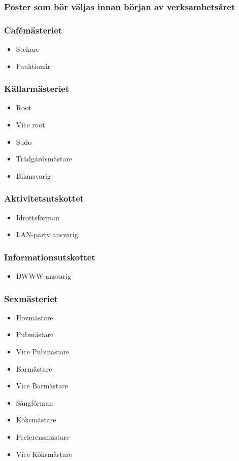 \documentclass{dsekprotokoll}
\begin{document}
\subsubsection*{Poster som bör väljas innan början av verksamhetsåret}
\begin{multicols}{2}

    \subsubsection*{Cafémästeriet}
    \begin{itemize}
        \item Stekare
        \item Funktionär
    \end{itemize}

    \subsubsection*{Källarmästeriet}
    \begin{itemize}
        \item Root
        \item Vice root
        \item Sudo
        \item Trädgårdsmästare
        \item Bilansvarig
    \end{itemize}

    \subsubsection*{Aktivitetsutskottet}
    \begin{itemize}
        \item Idrottsförman
        \item LAN-party ansvarig
    \end{itemize}

    \subsubsection*{Informationsutskottet}
    \begin{itemize}
        \item DWWW-ansvarig
    \end{itemize}

    \subsubsection*{Sexmästeriet}
    \begin{itemize}
        \item Hovmästare
        \item Pubmästare
        \item Vice Pubmästare
        \item Barmästare
        \item Vice Barmästare
        \item Sångförman
        \item Köksmästare
        \item Preferensmästare
        \item Vice Köksmästare
    \end{itemize}


\end{multicols}
\end{document}
